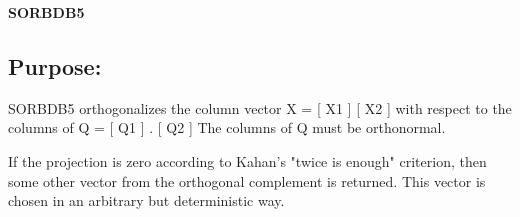{\bfseries S\+O\+R\+B\+D\+B5} 

\subsection*{Purpose\+: }

\begin{DoxyVerb} SORBDB5 orthogonalizes the column vector
      X = [ X1 ]
          [ X2 ]
 with respect to the columns of
      Q = [ Q1 ] .
          [ Q2 ]
 The columns of Q must be orthonormal.

 If the projection is zero according to Kahan's "twice is enough"
 criterion, then some other vector from the orthogonal complement
 is returned. This vector is chosen in an arbitrary but deterministic
 way.\end{DoxyVerb}
 
